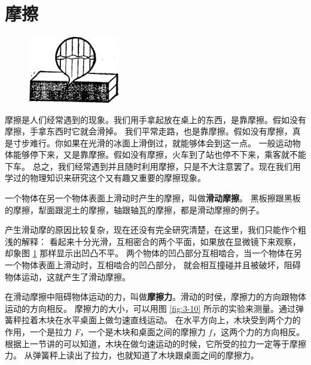\section{摩擦}\label{sec:3-10}

\begin{figure}
    \centering
    \includegraphics[width=4cm]{../pic/czwl1-ch3-9}
    \caption{}\label{fig:3-9}
\end{figure}

摩擦是人们经常遇到的现象。我们用手拿起放在桌上的东西，是靠摩擦。假如没有摩擦，手拿东西时它就会滑掉。
我们平常走路，也是靠摩擦。假如没有摩擦，真是寸步难行。你如果在光滑的冰面上滑倒过，就能够体会到这一点。
一般运动物体能够停下来，又是靠摩擦。假如没有摩擦，火车到了站也停不下来，乘客就不能下车。
总之，我们经常遇到并且随时利用摩擦，只是不大注意罢了。现在我们用学过的物理知识来研究这个又有趣又重要的摩擦现象。

一个物体在另一个物体表面上滑动时产生的摩擦，叫做\textbf{滑动摩擦}。
黑板擦跟黑板的摩擦，犁面跟泥土的摩擦，轴跟轴瓦的摩擦，都是滑动摩擦的例子。

产生滑动摩的原因比较复杂，现在还没有完全研究清楚，在这里，我们只能作个粗浅的解释：
看起来十分光滑，互相密合的两个平面，如果放在显微镜下来观察，却象图 \ref{fig:3-9} 那样显示出凹凸不平。
两个物体的凹凸部分互相啮合，当一个物体在另一个物体表面上滑动时，互相啮合的凹凸部分，
就会相互撞碰并且被破坏，阻碍物体运动，这就产生了滑动摩擦。

在滑动摩擦中阻碍物体运动的力，叫做\textbf{摩擦力}。滑动的时侯，摩擦力的方向跟物体运动的方向相反。
摩擦力的大小，可以用图 \ref{fig:3-10} 所示的实验来测量。通过弹簧秤拉着木块在水平桌面上做匀速直线运动。
在水平方向上，木块受到两个力的作用，一个是拉力 $F$，一个是木块和桌面之间的摩擦力 $f$，这两个力的方向相反。
根据上一节讲的可以知道，木块在做匀速运动的时候，它所受的拉力一定等于摩擦力。
从弹簧秤上读出了拉力，也就知道了木块跟桌面之间的摩擦力。


